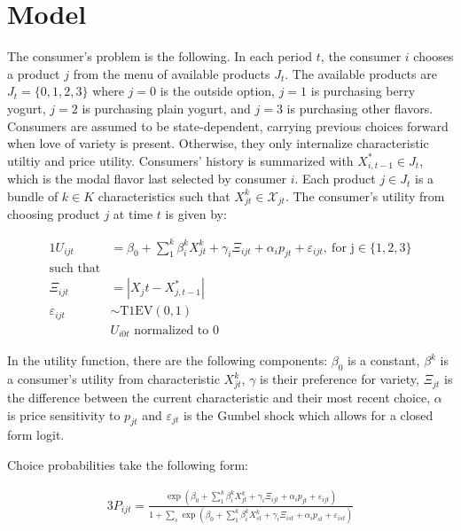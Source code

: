 \documentclass[11pt]{article}
\theoremstyle{definition}
\theoremstyle{remark}
\begin{document}
\section{Model}
    The consumer's problem is the following. In each period $t$, the consumer $i$ chooses a product $j$ from the menu of available products $J_t$. The available products are $J_t = \{0,1,2,3\}$ where $j=0$ is the outside option, $j=1$ is purchasing berry yogurt, $j=2$ is purchasing plain yogurt, and $j=3$ is purchasing other flavors. Consumers are assumed to be state-dependent, carrying previous choices forward when love of variety is present. Otherwise, they only internalize characteristic utiltiy and price utility. Consumers' history is summarized with $X^*_{i,t-1}\in J_t$, which is the modal flavor last selected by consumer $i$. Each product $j\in J_t$ is a bundle of $k\in K$ characteristics such that $X_{jt}^k \in \mathcal{X}_{jt}$. The consumer's utility from choosing product $j$ at time $t$ is given by:


    \begin{alignat*}{1}
      U_{ijt} &= \beta_0 + \sum_1^k\beta_i^k X^k_{jt} + \gamma_i\Xi_{ijt}
                  + \alpha_i p_{jt} +  \varepsilon_{ijt}, \ \text{for j$\in\{1,2,3\}$} \\
    \text{such that} \\
      \Xi_{ijt} &= |X_jt - X^*_{j,t-1}| \\
      \varepsilon_{ijt} &\sim \text{T1EV}(0,1) \\
      &\text{$U_{i0t}$ normalized to $0$}
    \end{alignat*}

    In the utility function, there are the following components: $\beta_0$ is a constant, $\beta^k$ is a consumer's utility from characteristic $X^k_{jt}$, $\gamma$ is their preference for variety, $\Xi_{jt}$ is the difference between the current characteristic and their most recent choice, $\alpha$ is price sensitivity to $p_{jt}$ and $\varepsilon_{jt}$ is the Gumbel shock which allows for a closed form logit. 

    Choice probabilities take the following form:

    \begin{alignat*}{3}
      P_{ijt} = \frac{\exp(\beta_0 + \sum_1^k\beta_i^kX_{jt}^k + \gamma_i\Xi_{ijt} + \alpha_ip_{jt} +  \varepsilon_{ijt})}{1 + \sum_s\exp(\beta_0+\sum_1^k\beta_i^kX_{st}^k + \gamma_i\Xi_{ist} + \alpha_ip_{st} + \varepsilon_{ist})}
    \end{alignat*}
\end{document}
